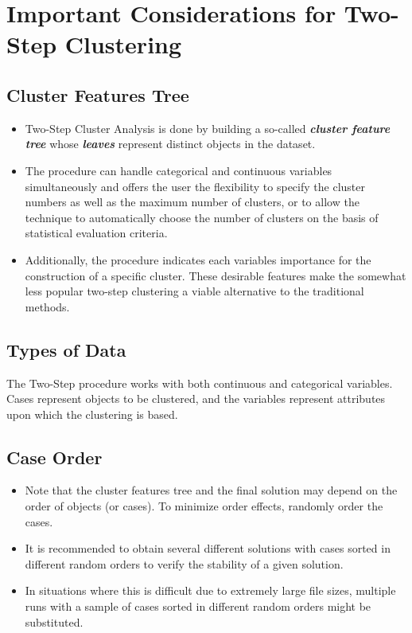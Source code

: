 \documentclass[a4paper,12pt]{article}
\begin{document}
\section{Important Considerations for Two-Step Clustering}
\subsection{Cluster Features Tree}

\begin{itemize}
	\item Two-Step Cluster Analysis is done by building a so-called \textbf{\textit{cluster feature tree}} whose \textbf{\textit{leaves}} represent distinct objects in the dataset. 
	\item The procedure can handle categorical and continuous variables simultaneously and offers the user the flexibility to specify the cluster numbers as well as the maximum number of clusters, or to allow the technique to automatically choose the number of clusters on the basis of statistical evaluation criteria.
	
	\item Additionally, the procedure indicates each variables importance for the construction of a specific cluster. These desirable features make the somewhat less popular two-step clustering a viable alternative to the traditional
	methods.
	
	
\end{itemize}


\subsection{Types of Data} The Two-Step procedure works with both continuous and categorical variables. Cases represent objects to be clustered, and the variables represent attributes upon which the clustering is based.



\subsection{Case Order}
\begin{itemize}
    \item Note that the cluster features tree and the final solution may depend on the order of objects (or cases). To minimize order effects, randomly order the cases. 
    \item It is recommended to obtain several different solutions with cases sorted in different random orders to verify the stability of a given solution. 
    \item In situations where this is difficult due to extremely large file sizes, multiple runs with a sample of cases sorted in different random orders might be substituted.
\end{itemize}
\end{document}
